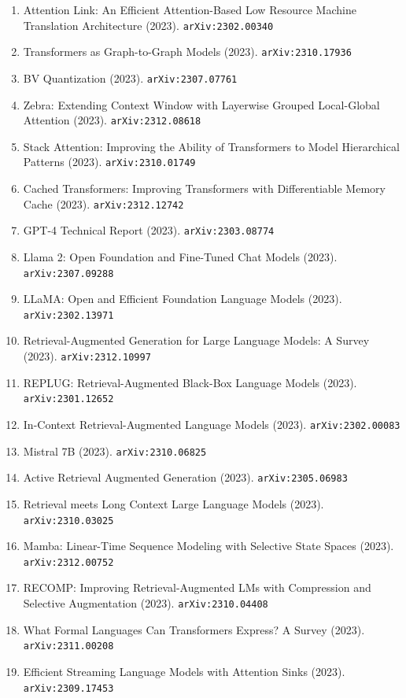 \documentclass[11pt]{article}
\begin{document}
\begin{enumerate}
  \item Attention Link: An Efficient Attention-Based Low Resource Machine
  Translation Architecture (2023). \texttt{arXiv:2302.00340}
  \item Transformers as Graph-to-Graph Models (2023). \texttt{arXiv:2310.17936}
  \item BV Quantization (2023). \texttt{arXiv:2307.07761}
  \item Zebra: Extending Context Window with Layerwise Grouped Local-Global
  Attention (2023). \texttt{arXiv:2312.08618}
  \item Stack Attention: Improving the Ability of Transformers to Model
  Hierarchical Patterns (2023). \texttt{arXiv:2310.01749}
  \item Cached Transformers: Improving Transformers with Differentiable Memory
  Cache (2023). \texttt{arXiv:2312.12742}
  \item GPT-4 Technical Report (2023). \texttt{arXiv:2303.08774}
  \item Llama 2: Open Foundation and Fine-Tuned Chat Models (2023). \texttt{arXiv:2307.09288}
  \item LLaMA: Open and Efficient Foundation Language Models (2023). \texttt{arXiv:2302.13971}
  \item Retrieval-Augmented Generation for Large Language Models: A Survey (2023). \texttt{arXiv:2312.10997}
  \item REPLUG: Retrieval-Augmented Black-Box Language Models (2023). \texttt{arXiv:2301.12652}
  \item In-Context Retrieval-Augmented Language Models (2023). \texttt{arXiv:2302.00083}
  \item Mistral 7B (2023). \texttt{arXiv:2310.06825}
  \item Active Retrieval Augmented Generation (2023). \texttt{arXiv:2305.06983}
  \item Retrieval meets Long Context Large Language Models (2023). \texttt{arXiv:2310.03025}
  \item Mamba: Linear-Time Sequence Modeling with Selective State Spaces (2023). \texttt{arXiv:2312.00752}
  \item RECOMP: Improving Retrieval-Augmented LMs with Compression and Selective
  Augmentation (2023). \texttt{arXiv:2310.04408}
  \item What Formal Languages Can Transformers Express? A Survey (2023). \texttt{arXiv:2311.00208}
  \item Efficient Streaming Language Models with Attention Sinks (2023). \texttt{arXiv:2309.17453}

\end{enumerate}
\end{document}
